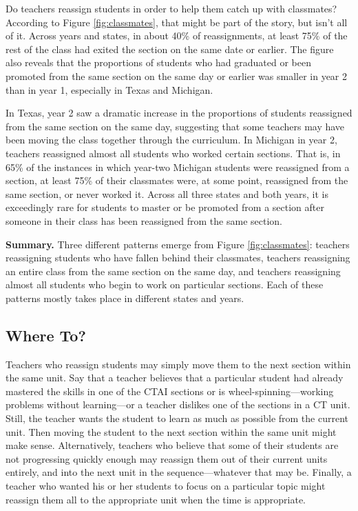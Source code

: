 \documentclass[12pt]{article}\usepackage[]{graphicx}\usepackage[]{color}
\begin{document}
Do teachers reassign students in order to help them catch up with classmates?
According to Figure \ref{fig:classmates}, that might be part of the
story, but isn't all of it.
Across years and states, in about 40\% of
reassignments, at least 75\% of the rest of the class had exited the
section on the same date or earlier.
The figure also reveals that the proportions of students who had graduated or been
promoted from the same section on the same day or earlier was smaller in year 2
than in year 1, especially in Texas and Michigan.

In Texas, year 2 saw a dramatic increase in the proportions of
students reassigned from the same section on the same day, suggesting
that some teachers may have been moving the class together through the
curriculum.
In Michigan in year 2, teachers reassigned almost all students who
worked certain sections.
That is, in 65\% of the instances in which year-two Michigan
students were reassigned from a section, at least 75\% of their
classmates were, at some point, reassigned from the same section, or
never worked it.
Across all three states and both years, it is exceedingly rare for
students to master or be promoted from a section after someone in
their class has been reassigned from the same section.

\textbf{Summary.} Three different patterns emerge from Figure
\ref{fig:classmates}: teachers reassigning students who have fallen
behind their classmates, teachers reassigning an entire class from the
same section on the same day, and teachers reassigning almost all
students who begin to work on particular sections.
Each of these patterns mostly takes place in different states and
years.

\subsection{Where To?}

Teachers who reassign students may simply move them to the next
section within the same unit.
Say that a teacher believes that a particular student had already mastered
the skills in one of the CTAI sections or is wheel-spinning---working
problems without learning---or a teacher dislikes one of the sections in a CT unit.
Still, the teacher wants the student to learn as much as possible from
the current unit.
Then moving the student to the next section within the same unit might
make sense.
Alternatively, teachers who believe that some of their students are
not progressing quickly enough may reassign them out of their current
units entirely, and into the next unit in the sequence---whatever that
may be.
Finally, a teacher who wanted his or her students to focus on a
particular topic might reassign them all to the appropriate unit
when the time is appropriate.
\end{document}
